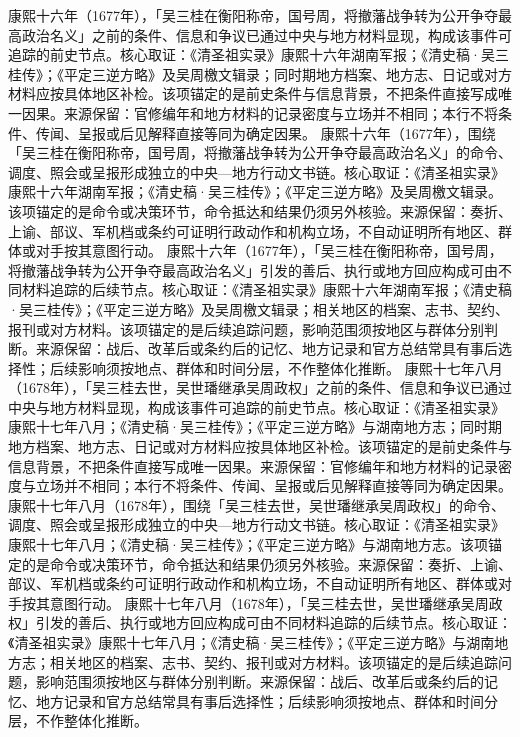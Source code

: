 康熙十六年（1677年），「吴三桂在衡阳称帝，国号周，将撤藩战争转为公开争夺最高政治名义」之前的条件、信息和争议已通过中央与地方材料显现，构成该事件可追踪的前史节点。核心取证：《清圣祖实录》康熙十六年湖南军报；《清史稿·吴三桂传》；《平定三逆方略》及吴周檄文辑录；同时期地方档案、地方志、日记或对方材料应按具体地区补检。该项锚定的是前史条件与信息背景，不把条件直接写成唯一因果。来源保留：官修编年和地方材料的记录密度与立场并不相同；本行不将条件、传闻、呈报或后见解释直接等同为确定因果。
康熙十六年（1677年），围绕「吴三桂在衡阳称帝，国号周，将撤藩战争转为公开争夺最高政治名义」的命令、调度、照会或呈报形成独立的中央—地方行动文书链。核心取证：《清圣祖实录》康熙十六年湖南军报；《清史稿·吴三桂传》；《平定三逆方略》及吴周檄文辑录。该项锚定的是命令或决策环节，命令抵达和结果仍须另外核验。来源保留：奏折、上谕、部议、军机档或条约可证明行政动作和机构立场，不自动证明所有地区、群体或对手按其意图行动。
康熙十六年（1677年），「吴三桂在衡阳称帝，国号周，将撤藩战争转为公开争夺最高政治名义」引发的善后、执行或地方回应构成可由不同材料追踪的后续节点。核心取证：《清圣祖实录》康熙十六年湖南军报；《清史稿·吴三桂传》；《平定三逆方略》及吴周檄文辑录；相关地区的档案、志书、契约、报刊或对方材料。该项锚定的是后续追踪问题，影响范围须按地区与群体分别判断。来源保留：战后、改革后或条约后的记忆、地方记录和官方总结常具有事后选择性；后续影响须按地点、群体和时间分层，不作整体化推断。
康熙十七年八月（1678年），「吴三桂去世，吴世璠继承吴周政权」之前的条件、信息和争议已通过中央与地方材料显现，构成该事件可追踪的前史节点。核心取证：《清圣祖实录》康熙十七年八月；《清史稿·吴三桂传》；《平定三逆方略》与湖南地方志；同时期地方档案、地方志、日记或对方材料应按具体地区补检。该项锚定的是前史条件与信息背景，不把条件直接写成唯一因果。来源保留：官修编年和地方材料的记录密度与立场并不相同；本行不将条件、传闻、呈报或后见解释直接等同为确定因果。
康熙十七年八月（1678年），围绕「吴三桂去世，吴世璠继承吴周政权」的命令、调度、照会或呈报形成独立的中央—地方行动文书链。核心取证：《清圣祖实录》康熙十七年八月；《清史稿·吴三桂传》；《平定三逆方略》与湖南地方志。该项锚定的是命令或决策环节，命令抵达和结果仍须另外核验。来源保留：奏折、上谕、部议、军机档或条约可证明行政动作和机构立场，不自动证明所有地区、群体或对手按其意图行动。
康熙十七年八月（1678年），「吴三桂去世，吴世璠继承吴周政权」引发的善后、执行或地方回应构成可由不同材料追踪的后续节点。核心取证：《清圣祖实录》康熙十七年八月；《清史稿·吴三桂传》；《平定三逆方略》与湖南地方志；相关地区的档案、志书、契约、报刊或对方材料。该项锚定的是后续追踪问题，影响范围须按地区与群体分别判断。来源保留：战后、改革后或条约后的记忆、地方记录和官方总结常具有事后选择性；后续影响须按地点、群体和时间分层，不作整体化推断。
